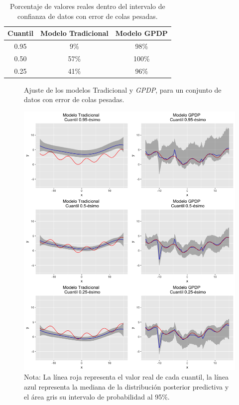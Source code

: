 \begin{table}[H]
\centering
\caption{Porcentaje de valores reales dentro del intervalo de confianza de datos con error de colas pesadas.} 
\begin{tabular}{ccc}
  \hline
Cuantil & Modelo Tradicional & Modelo GPDP \\ 
  \hline
0.95 & 9\% & 98\% \\ 
  0.50 & 57\% & 100\% \\ 
  0.25 & 41\% & 96\% \\ 
   \hline
\end{tabular}
\label{within_heavy_tails}
\end{table}

\begin{figure}[htbp]
	\centering
	\caption{Ajuste de los modelos Tradicional y \textit{GPDP}, para un conjunto de datos con error de colas pesadas.}
	\includegraphics[width=\textwidth]{Figures/Simulation/heavy_tails/predictions.png}
	\captionsetup{singlelinecheck=off,font=footnotesize}
    \caption*{Nota: La l\'inea roja representa el valor real de cada cuantil, la l\'inea azul representa la mediana de la distribuci\'on posterior predictiva y el \'area gris su intervalo de probabilidad al 95\%.}
	\label{models_heavy_tails}
\end{figure}

